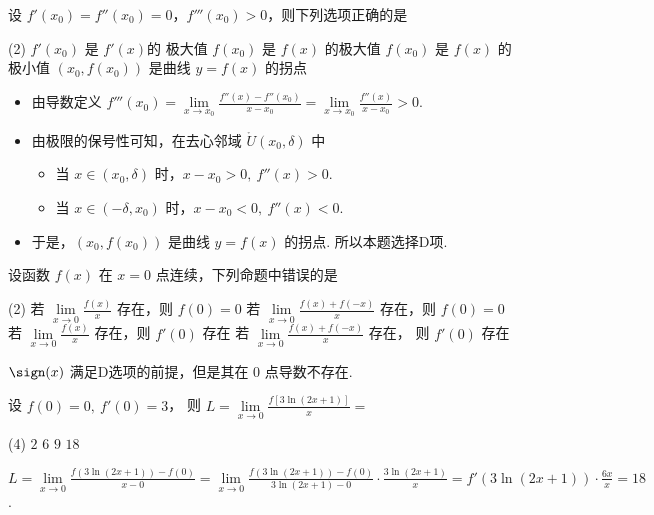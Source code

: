 \begin{problem}
  设 $f'(x_0) = f''(x_0) = 0$，$f'''(x_0) > 0$，则下列选项正确的是
  \begin{tasks}(2)
    \task $f'(x_0)$ 是 $f'(x)$的 极大值
    \task $f(x_0)$ 是 $f(x)$ 的极大值
    \task $f(x_0)$ 是 $f(x)$ 的极小值
    \task[\true] $(x_0,f(x_0))$ 是曲线 $y = f(x)$ 的拐点
  \end{tasks}
\end{problem}
\scratch[14ex]
\begin{solution}\leavevmode
  \begin{itemize}
    \item 由导数定义
    $ f'''(x_0) = \lim\limits_{x \to x_0} \frac{f''(x) - f''(x_0)}{x - x_0}
                = \lim\limits_{x \to x_0} \frac{f''(x)}{x - x_0} > 0$.
    \item 由极限的保号性可知，在去心邻域 $\mathring{U}(x_0,\delta)$ 中
    \begin{itemize}
      \item 当 $x \in (x_0,\delta)$ 时，$x - x_0 > 0,~ f''(x) > 0$.
      \item 当 $x \in (-\delta,x_0)$ 时，$x - x_0 < 0,~ f''(x) < 0$.
    \end{itemize}
    \item 于是，$(x_0,f(x_0))$ 是曲线 $y = f(x)$ 的拐点. 所以本题选择D项.
  \end{itemize}
\end{solution}

\begin{problem}
  设函数 $f(x)$ 在 $x = 0$ 点连续，下列命题中错误的是
  \begin{tasks}(2)
    \task 若 $\lim\limits_{x \to 0} \frac{f(x)}{x}$ 存在，则 $f(0) = 0$
    \task 若 $\lim\limits_{x \to 0} \frac{f(x) + f(-x)}{x}$ 存在，则 $f(0) = 0$
    \task 若 $\lim\limits_{x \to 0} \frac{f(x)}{x}$ 存在，则 $f'(0)$ 存在
    \task[\true] 若 $\lim\limits_{x \to 0} \frac{f(x) + f(-x)}{x}$ 存在，
    则 $f'(0)$ 存在
  \end{tasks}
\end{problem}
\scratch[4ex]
\begin{solution}
  $\sign(x)$ 满足D选项的前提，但是其在 $0$ 点导数不存在.
\end{solution}

\begin{problem}
  设 $f(0) = 0,~ f'(0) = 3$，
  则 $L = \lim\limits_{x \to 0} \frac{f[3\ln(2x + 1)]}{x} = $
  \begin{tasks}(4)
    \task $2$
    \task $6$
    \task $9$
    \task[\true] $18$
  \end{tasks}
\end{problem}
\scratch[10ex]
\begin{solution}
  $ L = \lim\limits_{x \to 0} \frac{f(3\ln(2x + 1)) - f(0)}{x - 0}
      = \lim\limits_{x \to 0}
        \frac{f(3\ln(2x + 1)) - f(0)}{3\ln(2x + 1) - 0} \cdot
        \frac{3\ln(2x + 1)}{x} = f'(3\ln(2x + 1)) \cdot \frac{6x}{x} = 18$.
\end{solution}

